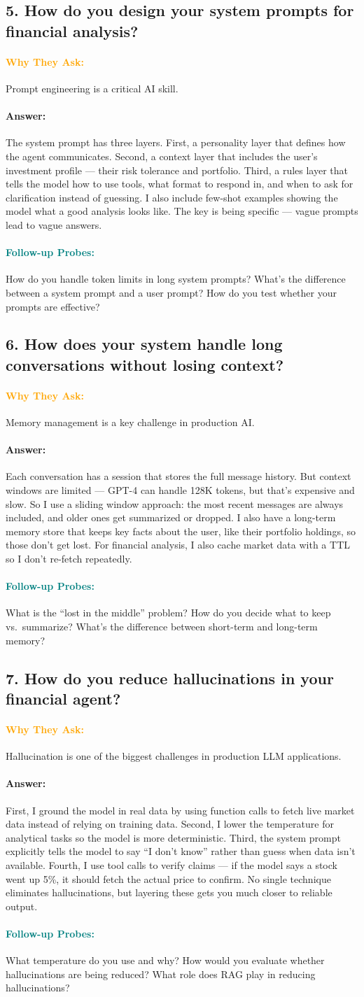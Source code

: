 \documentclass[11pt,a4paper]{article}
\newcommand{\Q}[1]{\subsection{#1}}
\newcommand{\Ans}[1]{\paragraph{\textbf{Answer:}} #1}
\newcommand{\Why}{\paragraph{\textcolor{orange}{\textbf{Why They Ask:}}}}
\newcommand{\Probe}{\paragraph{\textcolor{teal}{\textbf{Follow-up Probes:}}}}
\begin{document}
\Q{5. How do you design your system prompts for financial analysis?}
\Why Prompt engineering is a critical AI skill.
\Ans The system prompt has three layers. First, a personality layer that defines how the agent communicates. Second, a context layer that includes the user's investment profile --- their risk tolerance and portfolio. Third, a rules layer that tells the model how to use tools, what format to respond in, and when to ask for clarification instead of guessing. I also include few-shot examples showing the model what a good analysis looks like. The key is being specific --- vague prompts lead to vague answers.
\Probe How do you handle token limits in long system prompts? What's the difference between a system prompt and a user prompt? How do you test whether your prompts are effective?

\Q{6. How does your system handle long conversations without losing context?}
\Why Memory management is a key challenge in production AI.
\Ans Each conversation has a session that stores the full message history. But context windows are limited --- GPT-4 can handle 128K tokens, but that's expensive and slow. So I use a sliding window approach: the most recent messages are always included, and older ones get summarized or dropped. I also have a long-term memory store that keeps key facts about the user, like their portfolio holdings, so those don't get lost. For financial analysis, I also cache market data with a TTL so I don't re-fetch repeatedly.
\Probe What is the ``lost in the middle'' problem? How do you decide what to keep vs.\ summarize? What's the difference between short-term and long-term memory?

\Q{7. How do you reduce hallucinations in your financial agent?}
\Why Hallucination is one of the biggest challenges in production LLM applications.
\Ans First, I ground the model in real data by using function calls to fetch live market data instead of relying on training data. Second, I lower the temperature for analytical tasks so the model is more deterministic. Third, the system prompt explicitly tells the model to say ``I don't know'' rather than guess when data isn't available. Fourth, I use tool calls to verify claims --- if the model says a stock went up 5\%, it should fetch the actual price to confirm. No single technique eliminates hallucinations, but layering these gets you much closer to reliable output.
\Probe What temperature do you use and why? How would you evaluate whether hallucinations are being reduced? What role does RAG play in reducing hallucinations?
\end{document}
